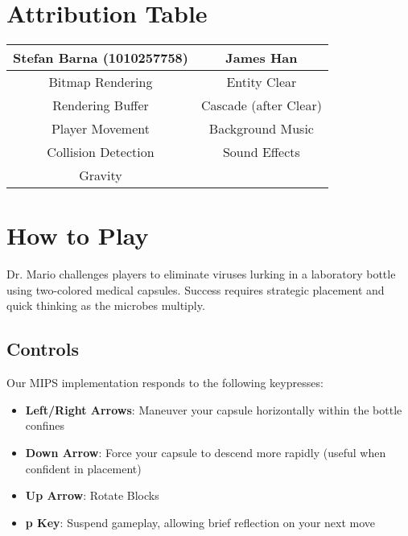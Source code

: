 \documentclass{article}
\begin{document}
\section{Attribution Table}
\begin{center}
\begin{tabular}{|| c | c ||}
\hline
Stefan Barna (1010257758) & James Han \\
\hline
\hline
Bitmap Rendering & Entity Clear \\
\hline
Rendering Buffer & Cascade (after Clear) \\
\hline
Player Movement & Background Music \\
\hline
Collision Detection & Sound Effects \\
\hline
Gravity & \\
\hline
\end{tabular}
\end{center}

\section{How to Play}
Dr. Mario challenges players to eliminate viruses lurking in a laboratory bottle using two-colored medical capsules. Success requires strategic placement and quick thinking as the microbes multiply.

\subsection{Controls}
Our MIPS implementation responds to the following keypresses:

\begin{itemize}
\item \textbf{Left/Right Arrows}: Maneuver your capsule horizontally within the bottle confines
\item \textbf{Down Arrow}: Force your capsule to descend more rapidly (useful when confident in placement)
\item \textbf{Up Arrow}: Rotate Blocks
\item \textbf{p Key}: Suspend gameplay, allowing brief reflection on your next move
\end{itemize}
\end{document}
